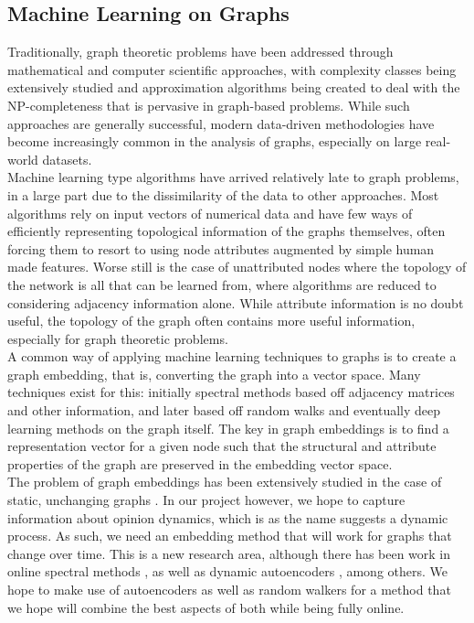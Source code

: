\documentclass[10pt]{article}
\begin{document}
\subsection{Machine Learning on Graphs}

Traditionally, graph theoretic problems have been addressed through mathematical and computer scientific approaches, with complexity classes being extensively studied and approximation algorithms being created to deal with the NP-completeness that is pervasive in graph-based problems. While such approaches are generally successful, modern data-driven methodologies have become increasingly common in the analysis of graphs, especially on large real-world datasets. \\

Machine learning type algorithms have arrived relatively late to graph problems, in a large part due to the dissimilarity of the data to other approaches. Most algorithms rely on input vectors of numerical data and have few ways of efficiently representing topological information of the graphs themselves, often forcing them to resort to using node attributes augmented by simple human made features. Worse still is the case of unattributed nodes where the topology of the network is all that can be learned from, where algorithms are reduced to considering adjacency information alone. While attribute information is no doubt useful, the topology of the graph often contains more useful information, especially for graph theoretic problems. \\ 

A common way of applying machine learning techniques to graphs is to create a graph embedding, that is, converting the graph into a vector space. Many techniques exist for this: initially spectral methods based off adjacency matrices and other information, and later based off random walks and eventually deep learning methods on the graph itself. The key in graph embeddings is to find a representation vector for a given node such that the structural and attribute properties of the graph are preserved in the embedding vector space. \\

The problem of graph embeddings has been extensively studied in the case of static, unchanging graphs \cite{goyal2018graph}. In our project however, we hope to capture information about opinion dynamics, which is as the name suggests a dynamic process. As such, we need an embedding method that will work for graphs that change over time. This is a new research area, although there has been work in online spectral methods 
\cite{li2017attributed}, as well as dynamic autoencoders \cite{goyal2018dyngem}, among others. We hope to make use of autoencoders as well as random walkers for a method that we hope will combine the best aspects of both while being fully online. \\
\end{document}
